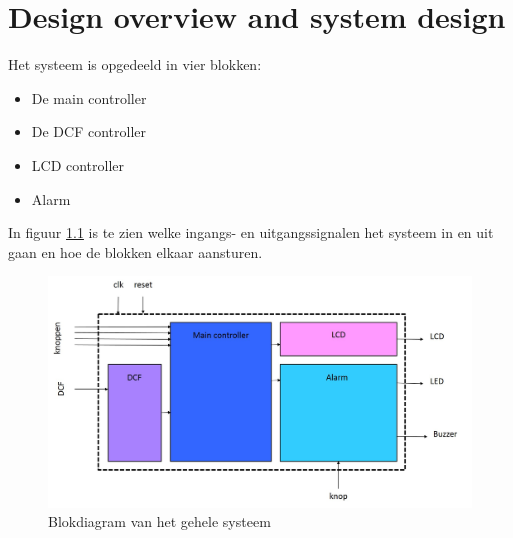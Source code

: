 
\chapter{Design overview and system design}
Het systeem is opgedeeld in vier blokken:
\begin{itemize}
\item De main controller
\item De DCF controller
\item LCD controller
\item Alarm
\end{itemize}

\noindent In figuur \ref{fig:blokdiagram} is te zien welke ingangs- en uitgangssignalen het systeem in en uit gaan en hoe de blokken elkaar aansturen.

\begin{figure}[h!]
\center
\includegraphics[width=13cm]{figure/blokdiagram}
\caption{Blokdiagram van het gehele systeem}
\label{fig:blokdiagram}
\end{figure}
